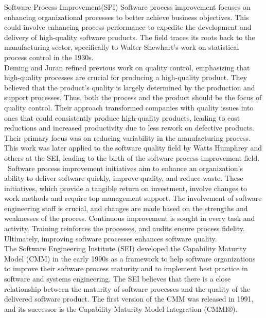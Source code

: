 \documentclass[final]{beamer}
\newlength{\colwidth}
\begin{document}
\begin{frame}[t]
\begin{columns}[t]
\begin{column}{\colwidth}
  \begin{block}{Software Process Improvement(SPI)}
	Software process improvement focuses on enhancing organizational processes to better achieve business objectives. This could involve enhancing process performance to expedite the development and delivery of high-quality software products. The field traces its roots back to the manufacturing sector, specifically to Walter Shewhart's work on statistical process control in the 1930s.\\
	Deming and Juran refined previous work on quality control, emphasizing that high-quality processes are crucial for producing a high-quality product. They believed that the product's quality is largely determined by the production and support processes. Thus, both the process and the product should be the focus of quality control. Their approach transformed companies with quality issues into ones that could consistently produce high-quality products, leading to cost reductions and increased productivity due to less rework on defective products. Their primary focus was on reducing variability in the manufacturing process.\cite{o2002practical}\\
  	This work was later applied to the software quality ﬁeld by Watts Humphrey and others at the SEI, leading to the birth of the software process improvement ﬁeld.
  	\ Software process improvement initiatives aim to enhance an organization’s ability to deliver software quickly, improve quality, and reduce waste. These initiatives, which provide a tangible return on investment, involve changes to work methods and require top management support. The involvement of software engineering staff is crucial, and changes are made based on the strengths and weaknesses of the process. Continuous improvement is sought in every task and activity. Training reinforces the processes, and audits ensure process fidelity. Ultimately, improving software processes enhances software quality.\\
  	The Software Engineering Institute (SEI) developed the Capability Maturity Model (CMM) in the early 1990s as a framework to help software organizations to improve their software process maturity and to implement best practice in software and systems engineering. The SEI believes that there is a close relationship between the maturity of software processes and the quality of the delivered software product. The ﬁrst version of the CMM was released in 1991, and its successor is the Capability Maturity Model Integration (CMMI®)\cite{chrissis_2011}.\\

\end{block}
\end{column}
\end{columns}
\end{frame}
\end{document}
